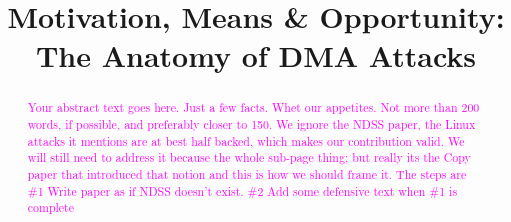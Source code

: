 \usepackage{filecontents}

\providecommand{\data}{\textit{data}}
\providecommand{\shinfo}{\texttt{skb\_shared\_info}}
\providecommand{\skb}{\texttt{sk\_buff}}
\providecommand{\page}{\texttt{struct page}}
\providecommand{\uarg}{\texttt{ubuf\_info}}
\providecommand{\kva}{KVA}
\providecommand{\iova}{IOVA}
\providecommand{\mabaf}{malicious buffer}
\providecommand{\spb}{SPB\-2 }
\providecommand{\oportunity}{\textit{Opportunity}}
\providecommand{\means}{\textit{Means}}
\providecommand{\motivation}{\textit{Motivation}}

\newcommand{\SV}[1]{{\textcolor{red}{[Shay:#1}]}} 



\date{}

\title{\Large \bf Motivation, Means \& Opportunity: The Anatomy of DMA Attacks}

\begin{comment}
\author{
{\rm Markuze Alex}\\
Technion, VMware Research
\and
{\rm Shay Vargaftik}\\
VMware Research
\and
{\rm Gil Kupfer}\\
Technion
\and
{\rm Nadav Amit}\\
VMware Research
\and{\rm Dan Tsafrir}\\
Technion, VMware Research
} %
\end{comment}

\maketitle

\begin{abstract}
\textcolor{magenta}{Your abstract text goes here. Just a few facts. Whet our appetites.
Not more than 200 words, if possible, and preferably closer to 150.\newline
We ignore the NDSS paper, the Linux attacks it mentions are at best half backed, which makes our contribution valid. We will still need to address it because the whole sub-page thing; but really its the Copy paper that introduced that notion and this is how we should frame it. The steps are \#1 Write paper as if NDSS doesn't exist. \#2 Add some defensive text when \#1 is complete}
\end{abstract}


